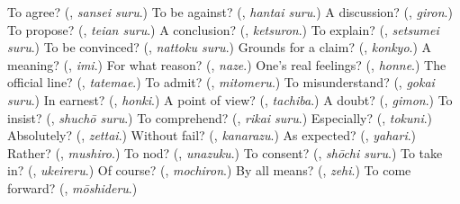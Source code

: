 \begin{tcolorbox}[breakable,colback=teal!4,colframe=teal!35!black,title={Before you move on}]
To agree? (\textbf{}, \emph{sansei suru}.) To be against? (\textbf{}, \emph{hantai suru}.) A discussion? (\textbf{}, \emph{giron}.) To propose? (\textbf{}, \emph{teian suru}.) A conclusion? (\textbf{}, \emph{ketsuron}.) To explain? (\textbf{}, \emph{setsumei suru}.) To be convinced? (\textbf{}, \emph{nattoku suru}.) Grounds for a claim? (\textbf{}, \emph{konkyo}.) A meaning? (\textbf{}, \emph{imi}.) For what reason? (\textbf{}, \emph{naze}.) One's real feelings? (\textbf{}, \emph{honne}.) The official line? (\textbf{}, \emph{tatemae}.) To admit? (\textbf{}, \emph{mitomeru}.) To misunderstand? (\textbf{}, \emph{gokai suru}.) In earnest? (\textbf{}, \emph{honki}.) A point of view? (\textbf{}, \emph{tachiba}.) A doubt? (\textbf{}, \emph{gimon}.) To insist? (\textbf{}, \emph{shuchō suru}.) To comprehend? (\textbf{}, \emph{rikai suru}.) Especially? (\textbf{}, \emph{tokuni}.) Absolutely? (\textbf{}, \emph{zettai}.) Without fail? (\textbf{}, \emph{kanarazu}.) As expected? (\textbf{}, \emph{yahari}.) Rather? (\textbf{}, \emph{mushiro}.) To nod? (\textbf{}, \emph{unazuku}.) To consent? (\textbf{}, \emph{shōchi suru}.) To take in? (\textbf{}, \emph{ukeireru}.) Of course? (\textbf{}, \emph{mochiron}.) By all means? (\textbf{}, \emph{zehi}.) To come forward? (\textbf{}, \emph{mōshideru}.)
\end{tcolorbox}
